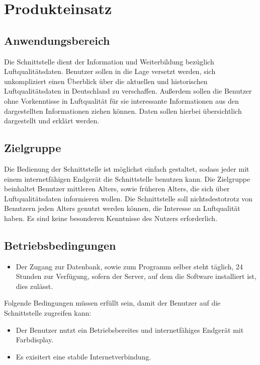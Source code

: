\section{Produkteinsatz}
\subsection{Anwendungsbereich}
\item Die Schnittstelle dient der Information und Weiterbildung bezüglich \Gls{Luftqualitätsdaten}. 
Benutzer sollen in die Lage versetzt werden, sich unkompliziert
einen Überblick über die aktuellen und historischen \Gls{Luftqualitätsdaten} in Deutschland zu verschaffen.
Außerdem sollen die Benutzer ohne Vorkenntisse in Luftqualität für sie interessante Informationen aus den dargestellten
Informationen ziehen können. Daten sollen hierbei übersichtlich dargestellt und erklärt werden.
\subsection{Zielgruppe}
\item Die Bedienung der Schnittstelle ist möglichst einfach gestaltet, sodass jeder mit einem internetfähigen \Gls{Endgerät} die Schnittstelle benutzen kann.
Die Zielgruppe beinhaltet Benutzer mittleren Alters, sowie früheren Alters, die sich über \Gls{Luftqualitätsdaten} informieren wollen. 
Die Schnittstelle soll nichtsdestotrotz von Benutzern jeden Alters genutzt werden können, die Interesse an Luftqualität haben.
Es sind keine besonderen Kenntnisse des Nutzers erforderlich.
\subsection{Betriebsbedingungen}
\begin{itemize}
    \item Der Zugang zur Datenbank, sowie zum Programm selber steht täglich,
    24 Stunden zur Verfügung, sofern der Server, auf dem die Software installiert ist,
    dies zulässt.
\end{itemize}
\item Folgende Bedingungen müssen erfüllt sein, damit der Benutzer auf die Schnittstelle zugreifen kann:
\begin{itemize}
    \item Der Benutzer nutzt ein Betriebsbereites und internetfähiges \Gls{Endgerät} mit Farbdisplay.
    \item Es exisitert eine stabile Internetverbindung.
\end{itemize}